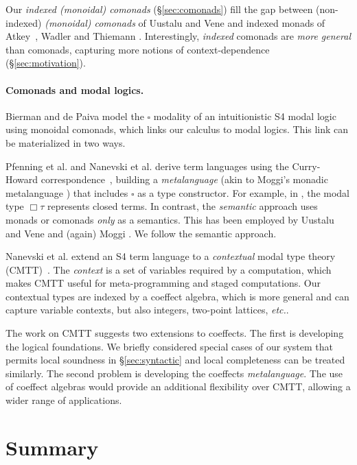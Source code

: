 Our \emph{indexed (monoidal) comonads} (\S\ref{sec:comonads}) fill the gap between (non-indexed)
\emph{(monoidal) comonads} of Uustalu and Vene \cite{comonads-notions}
and indexed monads of Atkey~\cite{monads-parameterised-notions}, Wadler and Thiemann
\cite{monads-effects-marriage}. Interestingly, \emph{indexed} comonads are \emph{more
general} than comonads, capturing more notions of context-dependence (\S\ref{sec:motivation}).


\vspace{-1em}
\paragraph{Comonads and modal logics.}

Bierman and de Paiva \cite{logic-intuitionistic-modal} model the
$\square$ modality of an intuitionistic S4 modal logic using monoidal
comonads, which links our calculus to modal logics.  This link can be
materialized in two ways.

Pfenning et al. and Nanevski et al.  derive term languages using the Curry-Howard
correspondence~\cite{logic-modal-reconstruction,logic-intuitionistic-modal,logic-cmtt},
building a \emph{metalanguage} (akin to Moggi's monadic metalanguage
\cite{monad-notions}) that includes $\square$ as a type
constructor. For example, in \cite{logic-modal-reconstruction}, the
modal type $\Box \tau$ represents closed terms.
In contrast, the \emph{semantic} approach uses monads or comonads
\emph{only} as a semantics.  This has been employed by Uustalu and
Vene and (again) Moggi \cite{monad-notions,comonads-notions}.  We
follow the semantic approach.

Nanevski et al. extend an S4 term language to a \emph{contextual}
modal type theory (CMTT)~\cite{logic-cmtt}.
The \emph{context} is a set of variables required by a computation, which
makes CMTT useful for meta-programming and staged computations. Our contextual types are
indexed by a coeffect algebra, which is more general and can capture
variable contexts, but also integers, two-point lattices, \emph{etc.}.

The work on CMTT suggests two extensions to coeffects. The first is
developing the logical foundations. We briefly considered special cases
of our system that permits local soundness in \S\ref{sec:syntactic} and
local completeness can be treated similarly. The second problem is 
developing the coeffects \emph{metalanguage}. The use of coeffect algebras
would provide an additional flexibility over CMTT, allowing a wider range 
of applications.

\section{Summary}
\label{sec:conclusions-summary}

